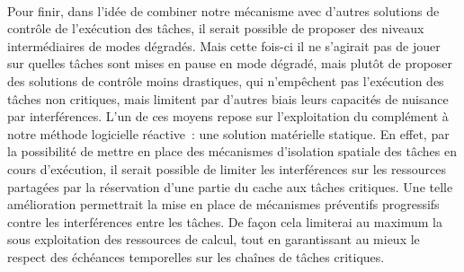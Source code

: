 \documentclass[a4paper,11pt,twoside]{StyleThese}
\begin{document}
\paragraph*{} Pour finir, dans l'idée de combiner notre mécanisme avec d'autres solutions de contrôle de l'exécution des tâches, il serait possible de proposer des niveaux intermédiaires de modes dégradés. Mais cette fois-ci il ne s'agirait pas de jouer sur quelles tâches sont mises en pause en mode dégradé, mais plutôt de proposer des solutions de contrôle moins drastiques, qui n'empêchent pas l'exécution des tâches non critiques, mais limitent par d'autres biais leurs capacités de nuisance par interférences. L'un de ces moyens repose sur l'exploitation du complément à notre méthode logicielle réactive~: une solution matérielle statique. En effet, par la possibilité de mettre en place des mécanismes d'isolation spatiale des tâches en cours d'exécution, il serait possible de limiter les interférences sur les ressources partagées par la réservation d'une partie du cache aux tâches critiques. Une telle amélioration permettrait la mise en place de mécanismes préventifs progressifs contre les interférences entre les tâches. De façon cela limiterai au maximum la sous exploitation des ressources de calcul, tout en garantissant au mieux le respect des échéances temporelles sur les chaînes de tâches critiques. 

\ifdefined{}
\else


\end{document}
